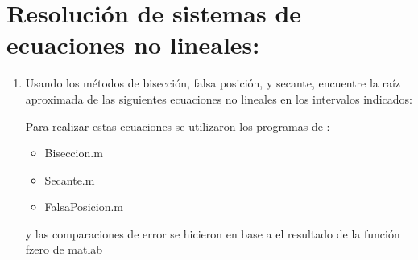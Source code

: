 \documentclass{udpreport}
\begin{document}
\chapter{Resolución de sistemas de ecuaciones no lineales:}
\begin{enumerate}
\item Usando los métodos de bisección, falsa posición, y secante, encuentre la raíz aproximada 
de las siguientes ecuaciones no lineales en los intervalos indicados:

    \begin{enumerate}
        
    Para realizar estas ecuaciones se utilizaron los programas de :
    \begin{itemize}
        \item Biseccion.m
        \item Secante.m
        \item FalsaPosicion.m
    \end{itemize}
    y las comparaciones de error se hicieron en base a el resultado de la función fzero de matlab
    

\end{enumerate}
\end{enumerate}
\end{document}
